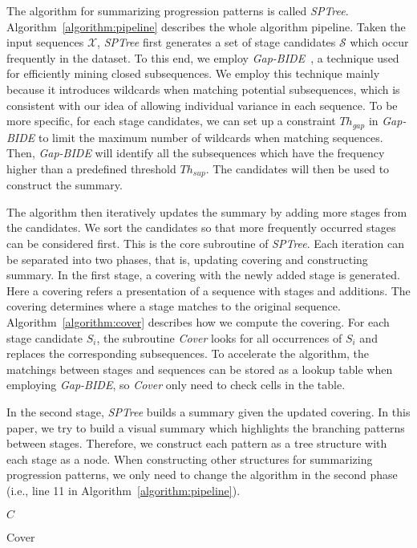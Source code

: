 The algorithm for summarizing progression patterns is called \textit{SPTree}. Algorithm~\ref{algorithm:pipeline} describes the whole algorithm pipeline. Taken the input sequences $\mathscr{X}$, \textit{SPTree} first generates a set of stage candidates $\mathscr{S}$ which occur frequently in the dataset. To this end, we employ \textit{Gap-BIDE}~\cite{li2008efficiently}, a technique used for efficiently mining closed subsequences. We employ this technique mainly because it introduces wildcards when matching potential subsequences, which is consistent with our idea of allowing individual variance in each sequence. To be more specific, for each stage candidates, we can set up a constraint $Th_{gap}$ in \textit{Gap-BIDE} to limit the maximum number of wildcards when matching sequences. Then, \textit{Gap-BIDE} will identify all the subsequences which have the frequency higher than a predefined threshold $Th_{sup}$. The candidates will then be used to construct the summary. 

The algorithm then iteratively updates the summary by adding more stages from the candidates. We sort the candidates so that more frequently occurred stages can be considered first. This is the core subroutine of \textit{SPTree}. Each iteration can be separated into two phases, that is, updating covering and constructing summary. In the first stage, a covering with the newly added stage is generated. Here a covering refers a presentation of a sequence with stages and additions. The covering determines where a stage matches to the original sequence. Algorithm~\ref{algorithm:cover} describes how we compute the covering. For each stage candidate $S_i$, the subroutine \textit{Cover} looks for all occurrences of $S_i$ and replaces the corresponding subsequences. To accelerate the algorithm, the matchings between stages and sequences can be stored as a lookup table when employing \textit{Gap-BIDE}, so \textit{Cover} only need to check cells in the table. 

In the second stage, \textit{SPTree} builds a summary given the updated covering. In this paper, we try to build a visual summary which highlights the branching patterns between stages. Therefore, we construct each pattern as a tree structure with each stage as a node. When constructing other structures for summarizing progression patterns, we only need to change the algorithm in the second phase (i.e., line 11 in Algorithm~\ref{algorithm:pipeline}). 

\begin{algorithm}
	\Return $C$
	\caption{Cover}
	\label{algorithm:cover}
\end{algorithm}

